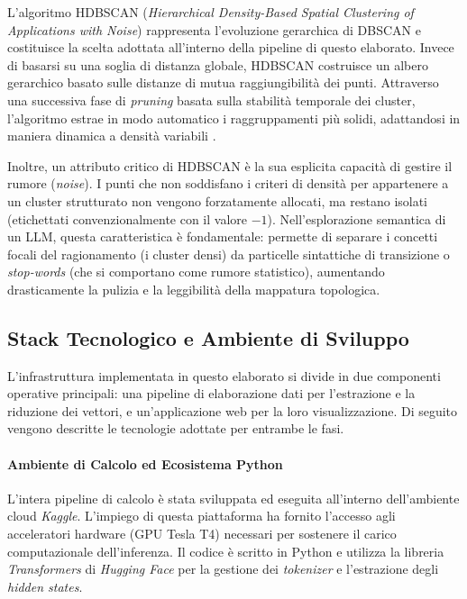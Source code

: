 L'algoritmo HDBSCAN (\textit{Hierarchical Density-Based Spatial Clustering of Applications with Noise}) rappresenta l'evoluzione gerarchica di DBSCAN e costituisce la scelta adottata all'interno della pipeline di questo elaborato. Invece di basarsi su una soglia di distanza globale, HDBSCAN costruisce un albero gerarchico basato sulle distanze di mutua raggiungibilità dei punti. Attraverso una successiva fase di \textit{pruning} basata sulla stabilità temporale dei cluster, l'algoritmo estrae in modo automatico i raggruppamenti più solidi, adattandosi in maniera dinamica a densità variabili \cite{campello2013density}. 

Inoltre, un attributo critico di HDBSCAN è la sua esplicita capacità di gestire il rumore (\textit{noise}). I punti che non soddisfano i criteri di densità per appartenere a un cluster strutturato non vengono forzatamente allocati, ma restano isolati (etichettati convenzionalmente con il valore $-1$). Nell'esplorazione semantica di un LLM, questa caratteristica è fondamentale: permette di separare i concetti focali del ragionamento (i cluster densi) da particelle sintattiche di transizione o \textit{stop-words} (che si comportano come rumore statistico), aumentando drasticamente la pulizia e la leggibilità della mappatura topologica.

\subsection{Stack Tecnologico e Ambiente di Sviluppo}
\label{sec:stack_tecnologico}

L'infrastruttura implementata in questo elaborato si divide in due componenti operative principali: una pipeline di elaborazione dati per l'estrazione e la riduzione dei vettori, e un'applicazione web per la loro visualizzazione. Di seguito vengono descritte le tecnologie adottate per entrambe le fasi.

\paragraph{Ambiente di Calcolo ed Ecosistema Python}
L'intera pipeline di calcolo è stata sviluppata ed eseguita all'interno dell'ambiente cloud \textit{Kaggle}. L'impiego di questa piattaforma ha fornito l'accesso agli acceleratori hardware (GPU Tesla T4) necessari per sostenere il carico computazionale dell'inferenza. Il codice è scritto in Python e utilizza la libreria \textit{Transformers} di \textit{Hugging Face} \cite{wolf2020transformers} per la gestione dei \textit{tokenizer} e l'estrazione degli \textit{hidden states}. 

